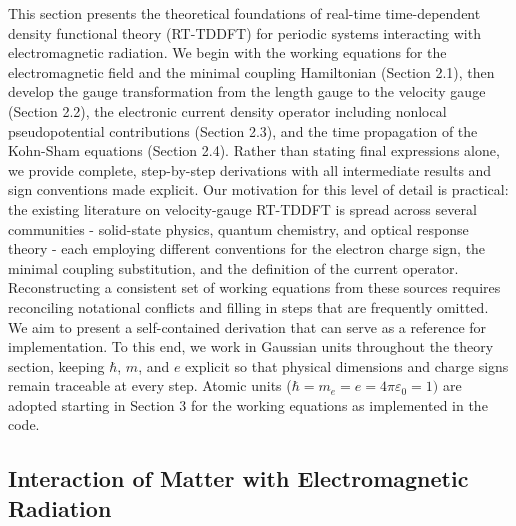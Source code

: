 This section presents the theoretical foundations of real-time time-dependent density functional theory (RT-TDDFT)
for periodic systems interacting with electromagnetic radiation. We begin with the working equations for 
the electromagnetic field and the minimal coupling Hamiltonian (Section 2.1), then develop the gauge transformation 
from the length gauge to the velocity gauge (Section 2.2), the electronic current density operator including nonlocal 
pseudopotential contributions (Section 2.3), and the time propagation of the Kohn-Sham equations (Section 2.4). 
Rather than stating final expressions alone, we provide complete, step-by-step derivations with all intermediate 
results and sign conventions made explicit. 
Our motivation for this level of detail is practical: the existing literature on velocity-gauge RT-TDDFT is spread 
across several communities - solid-state physics, quantum chemistry, and optical response theory - each employing 
different conventions for the electron charge sign, the minimal coupling substitution, and the definition of the current operator. 
Reconstructing a consistent set of working equations from these sources requires reconciling notational conflicts 
and filling in steps that are frequently omitted. 
We aim to present a self-contained derivation that can serve as a reference for implementation. 
To this end, we work in Gaussian units throughout the theory section, keeping $\hbar$, $m$, and $e$ explicit 
so that physical dimensions and charge signs remain traceable at every step. 
Atomic units ($\hbar=m_e=e=4\pi\varepsilon_0=1)$ are adopted starting in Section 3 for the working equations as implemented in the code.


\subsection{Interaction of Matter with Electromagnetic Radiation}
\label{sec:em-interaction}

%



